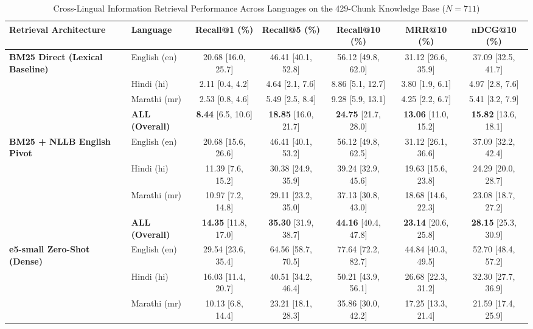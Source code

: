 \documentclass[conference]{IEEEtran}
\begin{document}
\begin{table}[t]
\caption{Cross-Lingual Information Retrieval Performance Across Languages on the 429-Chunk Knowledge Base ($N = 711$)}
\label{tab:retrieval_results}
\begin{center}
\begin{tabular}{l l c c c c c}
\toprule
\textbf{Retrieval Architecture} & \textbf{Language} & \textbf{Recall@1 (\%)} & \textbf{Recall@5 (\%)} & \textbf{Recall@10 (\%)} & \textbf{MRR@10 (\%)} & \textbf{nDCG@10 (\%)} \\
\midrule
\multirow{4}{*}{\textbf{BM25 Direct (Lexical Baseline)}} 
& English (en) & 20.68 [16.0, 25.7] & 46.41 [40.1, 52.8] & 56.12 [49.8, 62.0] & 31.12 [26.6, 35.9] & 37.09 [32.5, 41.7] \\
& Hindi (hi) & 2.11 [0.4, 4.2] & 4.64 [2.1, 7.6] & 8.86 [5.1, 12.7] & 3.80 [1.9, 6.1] & 4.97 [2.8, 7.6] \\
& Marathi (mr) & 2.53 [0.8, 4.6] & 5.49 [2.5, 8.4] & 9.28 [5.9, 13.1] & 4.25 [2.2, 6.7] & 5.41 [3.2, 7.9] \\
& \textbf{ALL (Overall)} & \textbf{8.44} [6.5, 10.6] & \textbf{18.85} [16.0, 21.7] & \textbf{24.75} [21.7, 28.0] & \textbf{13.06} [11.0, 15.2] & \textbf{15.82} [13.6, 18.1] \\
\midrule
\multirow{4}{*}{\textbf{BM25 + NLLB English Pivot}} 
& English (en) & 20.68 [15.6, 26.6] & 46.41 [40.1, 53.2] & 56.12 [49.8, 62.5] & 31.12 [26.1, 36.6] & 37.09 [32.2, 42.4] \\
& Hindi (hi) & 11.39 [7.6, 15.2] & 30.38 [24.9, 35.9] & 39.24 [32.9, 45.6] & 19.63 [15.6, 23.8] & 24.29 [20.0, 28.7] \\
& Marathi (mr) & 10.97 [7.2, 14.8] & 29.11 [23.2, 35.0] & 37.13 [30.8, 43.0] & 18.68 [14.6, 22.3] & 23.08 [18.7, 27.2] \\
& \textbf{ALL (Overall)} & \textbf{14.35} [11.8, 17.0] & \textbf{35.30} [31.9, 38.7] & \textbf{44.16} [40.4, 47.8] & \textbf{23.14} [20.6, 25.8] & \textbf{28.15} [25.3, 30.9] \\
\midrule
\multirow{4}{*}{\textbf{e5-small Zero-Shot (Dense)}} 
& English (en) & 29.54 [23.6, 35.4] & 64.56 [58.7, 70.5] & 77.64 [72.2, 82.7] & 44.84 [40.3, 49.5] & 52.70 [48.4, 57.2] \\
& Hindi (hi) & 16.03 [11.4, 20.7] & 40.51 [34.2, 46.4] & 50.21 [43.9, 56.1] & 26.68 [22.3, 31.2] & 32.30 [27.7, 36.9] \\
& Marathi (mr) & 10.13 [6.8, 14.4] & 23.21 [18.1, 28.3] & 35.86 [30.0, 42.2] & 17.25 [13.3, 21.4] & 21.59 [17.4, 25.9] \\

\end{tabular}
\end{center}
\end{table}
\end{document}
